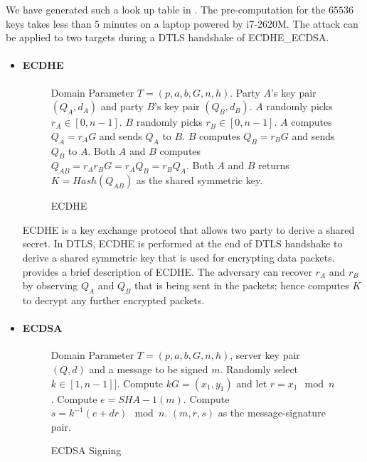 We have generated such a look up table in \cite{prngtest}. The pre-computation for the $65536$ keys takes less than 5 minutes on a laptop powered by i7-2620M. 
The attack can be applied to two targets during a DTLS handshake of ECDHE\_ECDSA.

\begin{itemize}
\item \paragraph{\textbf{ECDHE}}
	\begin{figure}
		\begin{algorithmic}[1]
		\REQUIRE Domain Parameter $T = (p, a, b, G, n, h)$. Party $A$'s key pair $(Q_A, d_A)$ and party $B$'s key pair $(Q_B, d_B)$. 
		\STATE $A$ randomly picks $r_A \in [0, n-1]$. 
		\STATE $B$ randomly picks $r_B \in [0, n-1]$.
		\STATE $A$ computes $Q_A = {r_A}G$ and sends $Q_A$ to $B$.
		\STATE $B$ computes $Q_B = {r_B}G$ and sends $Q_B$ to $A$.
		\STATE Both $A$ and $B$ computes $Q_{AB} = {r_A}{r_B}G = {r_A}{Q_B} = {r_B}{Q_A}$.
		\RETURN Both $A$ and $B$ returns $K = Hash(Q_{AB})$ as the shared symmetric key.
		\end{algorithmic}
		\caption{ECDHE}
		\label{ECDHE}
	\end{figure}
	
	ECDHE is a key exchange protocol that allows two party to derive a shared secret. In DTLS, ECDHE is performed at the end of DTLS handshake to derive a shared symmetric key that is used for encrypting data packets.  provides a brief description of ECDHE. The adversary can recover $r_A$ and $r_B$ by observing $Q_A$ and $Q_B$ that is being sent in the packets; hence computes $K$ to decrypt any further encrypted packets.

\item \paragraph{\textbf{ECDSA}}
	\begin{figure}
		\begin{algorithmic}[1]
		\REQUIRE Domain Parameter $T = (p, a, b, G, n, h)$, server key pair $(Q,d)$ and a message to be signed $m$.
		\STATE Randomly select $k \in [1, n-1]]$.
		\STATE Compute $kG = (x_1, y_1)$ and let $r = x_1 \mod n$.
		\STATE Compute $e = SHA-1(m)$.
		\STATE Compute $s = k^{-1}(e + dr) \mod n$.
		\RETURN $(m,r,s)$ as the message-signature pair.
		\end{algorithmic}
		\caption{ECDSA Signing}
		\label{ECDSA}
	\end{figure}
	

\end{itemize}
